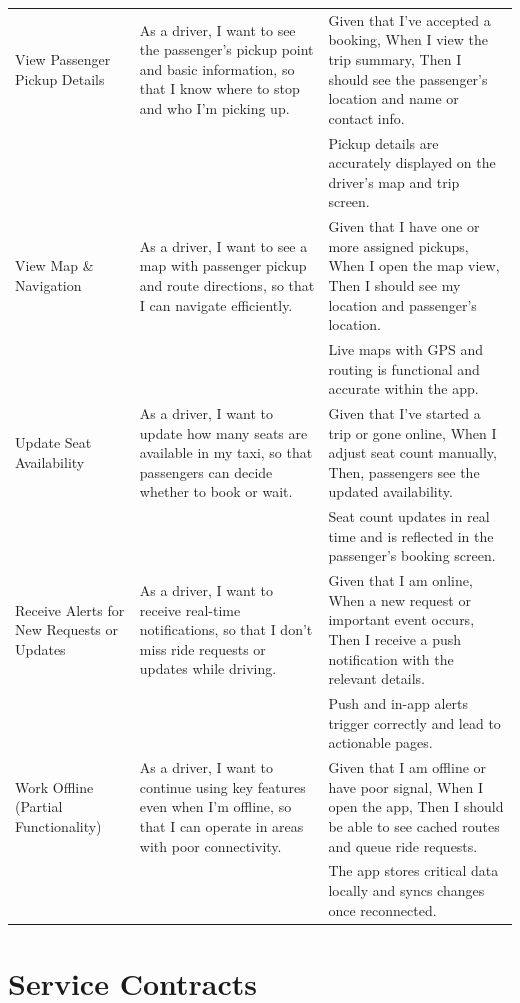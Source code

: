 \documentclass[a4paper,12pt]{article}
\begin{document}
\begin{longtable}{>{\raggedright}p{4cm} p{6cm} p{5cm}}
View Passenger Pickup Details & As a driver, I want to see the passenger’s pickup point and basic information, so that I know where to stop and who I’m picking up. & Given that I’ve accepted a booking, When I view the trip summary, Then I should see the passenger’s location and name or contact info. \\
& & Pickup details are accurately displayed on the driver's map and trip screen. \\ \midrule
View Map \& Navigation & As a driver, I want to see a map with passenger pickup and route directions, so that I can navigate efficiently. & Given that I have one or more assigned pickups, When I open the map view, Then I should see my location and passenger's location. \\
& & Live maps with GPS and routing is functional and accurate within the app. \\ \midrule
Update Seat Availability & As a driver, I want to update how many seats are available in my taxi, so that passengers can decide whether to book or wait. & Given that I’ve started a trip or gone online, When I adjust seat count manually, Then, passengers see the updated availability. \\
& & Seat count updates in real time and is reflected in the passenger’s booking screen. \\ \midrule
Receive Alerts for New Requests or Updates & As a driver, I want to receive real-time notifications, so that I don’t miss ride requests or updates while driving. & Given that I am online, When a new request or important event occurs, Then I receive a push notification with the relevant details. \\
& & Push and in-app alerts trigger correctly and lead to actionable pages. \\ \midrule
Work Offline (Partial Functionality) & As a driver, I want to continue using key features even when I’m offline, so that I can operate in areas with poor connectivity. & Given that I am offline or have poor signal, When I open the app, Then I should be able to see cached routes and queue ride requests. \\
& & The app stores critical data locally and syncs changes once reconnected. \\
\bottomrule
\end{longtable}

\section{Service Contracts}
\end{document}
